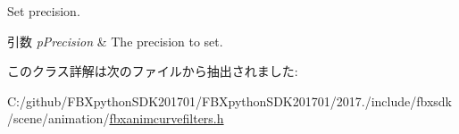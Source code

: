 Set precision. 
\begin{DoxyParams}{引数}
{\em p\+Precision} & The precision to set. \\
\hline
\end{DoxyParams}


このクラス詳解は次のファイルから抽出されました\+:\begin{DoxyCompactItemize}
\item 
C\+:/github/\+F\+B\+Xpython\+S\+D\+K201701/\+F\+B\+Xpython\+S\+D\+K201701/2017./include/fbxsdk/scene/animation/\hyperlink{fbxanimcurvefilters_8h}{fbxanimcurvefilters.\+h}\end{DoxyCompactItemize}
